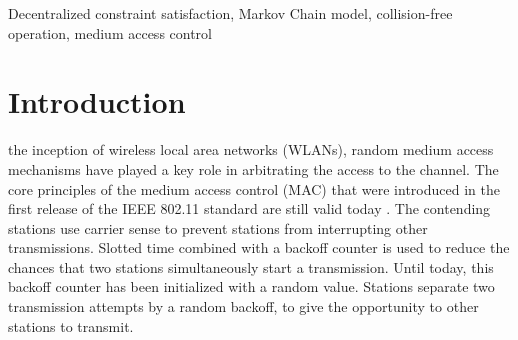\documentclass[journal]{IEEEtran}
\begin{document}
\begin{IEEEkeywords}
Decentralized constraint satisfaction, Markov Chain model, collision-free operation, medium access control
\end{IEEEkeywords}






%
\IEEEpeerreviewmaketitle



\section{Introduction}
%
%
%
%



 the inception of wireless local area networks (WLANs), random medium access mechanisms have played a key role in arbitrating the access to the channel. The core principles of the medium access control (MAC) that were introduced in the first release of the IEEE 802.11 standard are still valid today \cite{IEEE80211-IEEESTD2007}. The contending stations use carrier sense to prevent stations from interrupting other transmissions. Slotted time combined with a backoff counter is used to reduce the chances that two stations simultaneously start a transmission. Until today, this backoff counter has been initialized with a random value. Stations separate two transmission attempts by a random backoff, to give the opportunity to other stations to transmit.
\end{document}
